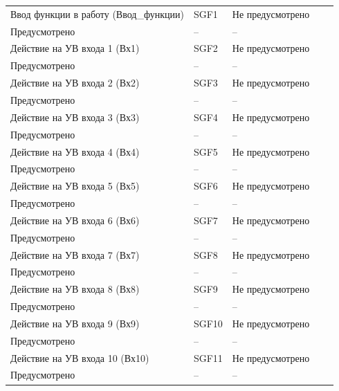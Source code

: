 \begin{longtable}{|>{\centering\arraybackslash}m{5.3cm}|>{\centering\arraybackslash}m{3.3cm}|>{\centering\arraybackslash}m{4.2cm}|>{\centering\arraybackslash}m{1.8cm}|>{\centering\arraybackslash}m{1cm}|}
\hline
\multicolumn{5}{|c|}{ УВ11 } \\ \hline 
\centering Ввод функции в работу (Ввод\_функции)  & \centering SGF1 & \centering Не предусмотрено \\ Предусмотрено & \centering -- & \centering \arraybackslash -- \\
\hline
\centering Действие на УВ входа 1 (Вх1)  & \centering SGF2 & \centering Не предусмотрено \\ Предусмотрено & \centering -- & \centering \arraybackslash -- \\
\hline
\centering Действие на УВ входа 2 (Вх2)  & \centering SGF3 & \centering Не предусмотрено \\ Предусмотрено & \centering -- & \centering \arraybackslash -- \\
\hline
\centering Действие на УВ входа 3 (Вх3)  & \centering SGF4 & \centering Не предусмотрено \\ Предусмотрено & \centering -- & \centering \arraybackslash -- \\
\hline
\centering Действие на УВ входа 4 (Вх4)  & \centering SGF5 & \centering Не предусмотрено \\ Предусмотрено & \centering -- & \centering \arraybackslash -- \\
\hline
\centering Действие на УВ входа 5 (Вх5)  & \centering SGF6 & \centering Не предусмотрено \\ Предусмотрено & \centering -- & \centering \arraybackslash -- \\
\hline
\centering Действие на УВ входа 6 (Вх6)  & \centering SGF7 & \centering Не предусмотрено \\ Предусмотрено & \centering -- & \centering \arraybackslash -- \\
\hline
\centering Действие на УВ входа 7 (Вх7)  & \centering SGF8 & \centering Не предусмотрено \\ Предусмотрено & \centering -- & \centering \arraybackslash -- \\
\hline
\centering Действие на УВ входа 8 (Вх8)  & \centering SGF9 & \centering Не предусмотрено \\ Предусмотрено & \centering -- & \centering \arraybackslash -- \\
\hline
\centering Действие на УВ входа 9 (Вх9)  & \centering SGF10 & \centering Не предусмотрено \\ Предусмотрено & \centering -- & \centering \arraybackslash -- \\
\hline
\centering Действие на УВ входа 10 (Вх10)  & \centering SGF11 & \centering Не предусмотрено \\ Предусмотрено & \centering -- & \centering \arraybackslash -- \\

\end{longtable}
